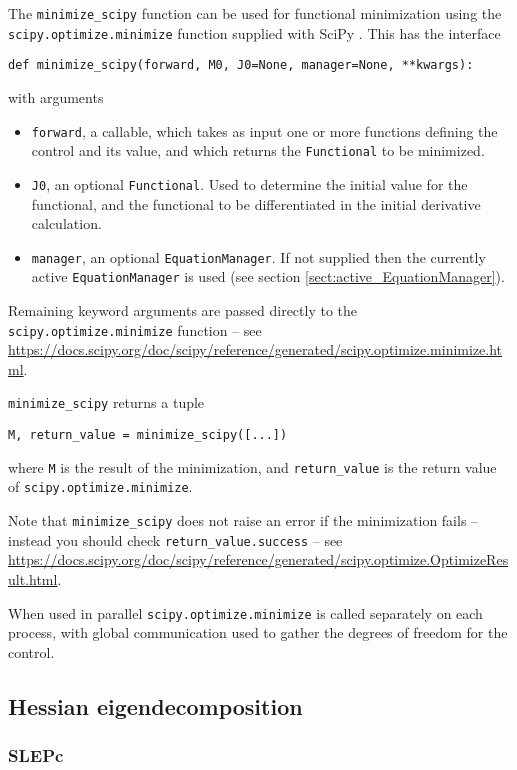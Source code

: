 \documentclass[11pt]{article}
\begin{document}
The \texttt{minimize\_scipy} function can be used for functional minimization
using the \texttt{scipy.optimize.minimize} function supplied with SciPy
\citep{virtanen2020}. This has the interface
\begin{lstlisting}
def minimize_scipy(forward, M0, J0=None, manager=None, **kwargs):
\end{lstlisting}
with arguments
\begin{itemize}
  \item \texttt{forward}, a callable, which takes as input one or more
    functions defining the control and its value, and which returns the
    \texttt{Functional} to be minimized.
  \item \texttt{J0}, an optional \texttt{Functional}. Used to determine the
    initial value for the functional, and the functional to be differentiated
    in the initial derivative calculation.
  \item \texttt{manager}, an optional \texttt{EquationManager}. If not supplied
    then the currently active \texttt{EquationManager} is used (see section
    \ref{sect:active_EquationManager}).
\end{itemize}
Remaining keyword arguments are passed directly to the
\texttt{scipy.optimize.minimize} function -- see
\url{https://docs.scipy.org/doc/scipy/reference/generated/scipy.optimize.minimize.html}.

\texttt{minimize\_scipy} returns a tuple
\begin{lstlisting}
M, return_value = minimize_scipy([...])
\end{lstlisting}
where \texttt{M} is the result of the minimization, and \texttt{return\_value}
is the return value of \texttt{scipy.optimize.minimize}.

Note that \texttt{minimize\_scipy} does not raise an error if the minimization
fails -- instead you should check \texttt{return\_value.success} -- see
\url{https://docs.scipy.org/doc/scipy/reference/generated/scipy.optimize.OptimizeResult.html}.

When used in parallel \texttt{scipy.optimize.minimize} is called separately on
each process, with global communication used to gather the degrees of freedom
for the control.

\subsection{Hessian eigendecomposition}

\subsubsection{SLEPc}
\end{document}
